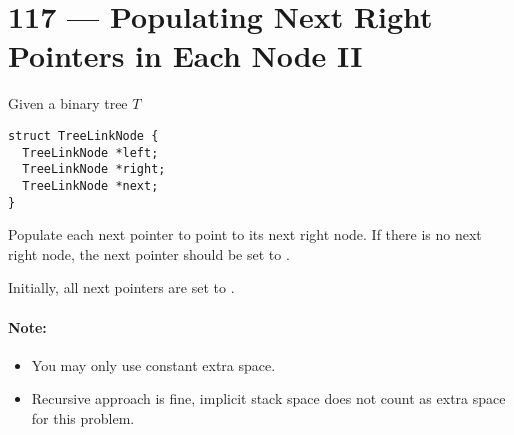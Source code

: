 \section{117 --- Populating Next Right Pointers in Each Node II}
Given a binary tree $T$
\setcounter{lstlisting}{0}
\begin{lstlisting}[style=customc]
struct TreeLinkNode {
  TreeLinkNode *left;
  TreeLinkNode *right;
  TreeLinkNode *next;
}
\end{lstlisting}

Populate each next pointer to point to its next right node. If there is no next right node, the next pointer should be set to .

Initially, all next pointers are set to .
\paragraph{Note:}
\begin{itemize}
    \item You may only use constant extra space.
    \item Recursive approach is fine, implicit stack space does not count as extra space for this problem.
\end{itemize}
